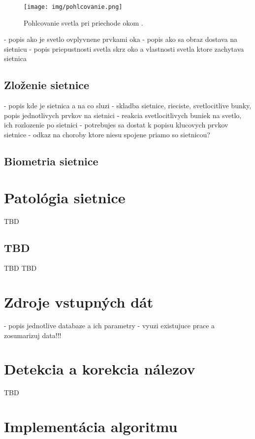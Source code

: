 \begin{figure}[h]
  \centering
  \texttt{[image: img/pohlcovanie.png]}
  \caption{Pohlcovanie svetla pri priechode okom \cite{vlast_oka}.}
  \label{fig:pohlc}
\end{figure}

- popis ako je svetlo ovplyvnene prvkami oka \cite{pato}
- popis ako sa obraz dostava na sietnicu
- popis priepustnosti svetla skrz oko a vlastnosti svetla ktore zachytava sietnica

\section{Zloženie sietnice}\label{sec:retina}

- popis kde je sietnica a na co sluzi \cite{vlast_oka}
- skladba sietnice, rieciste, svetlocitlive bunky, popis jednotlivych prvkov na sietnici
- reakcia svetlocitlivych buniek na svetlo, ich rozlozenie po sietnici
- potrebujes sa dostat k popisu klucovych prvkov sietnice
- odkaz na choroby ktore niesu spojene priamo so sietnicou?

\section{Biometria sietnice}\label{sec:bioret}

\chapter{Patológia sietnice}\label{ch:kap2}
TBD\cite{prim}
\section{TBD}
TBD\cite{sec}
TBD\cite{bio}

\chapter{Zdroje vstupných dát}\label{ch:kap3}
- popis jednotlive databaze a ich parametry - vyuzi existujuce prace a zosumarizuj data!!!

\chapter{Detekcia a korekcia nálezov}\label{ch:kap4}
TBD\cite{terc}

\chapter{Implementácia algoritmu}

